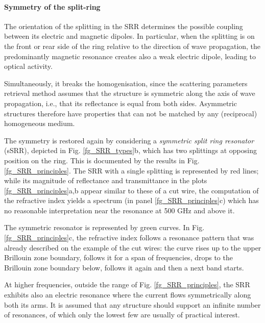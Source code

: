 \paragraph{Symmetry of the split-ring}%
The orientation of the splitting in the SRR determines the possible coupling between its electric and magnetic dipoles. In particular, when the splitting is on the front or rear side of the ring relative to the  direction of wave propagation, the predominantly magnetic resonance creates also a weak electric dipole, leading to optical activity. %

Simultaneously, it breaks the homogenisation, since the scattering parameters retrieval method assumes that the structure is symmetric along the axis of wave propagation, i.e., that its reflectance is equal from both sides. Asymmetric structures therefore have properties that can not be matched by any (reciprocal) homogeneous medium. 

The symmetry is restored again by considering a \textit{symmetric split ring resonator} (sSRR), depicted in Fig. \ref{fg_SRR_types}b, which has two splittings at opposing position on the ring. 
This is documented by the results in Fig. \ref{fg_SRR_principles}. The SRR with a single splitting is represented by red lines; while its magnitude of reflectance and transmittance in the plots \ref{fg_SRR_principles}a,b appear similar to these of a cut wire, the computation of the refractive index yields a spectrum (in panel \ref{fg_SRR_principles}c) which has no reasonable interpretation near the resonance at 500 GHz and above it. 

The symmetric resonator is represented by green curves. In Fig. \ref{fg_SRR_principles}c, the refractive index follows a resonance pattern that was already described on the example of the cut wires: the curve rises up to the upper Brillouin zone boundary, follows it for a span of frequencies, drops to the Brillouin zone boundary below, follows it again and then a next band starts. 

At higher frequencies, outside the range of Fig. \ref{fg_SRR_principles}, the SRR exhibits also an electric resonance where the current flows symmetrically along both its arms. It is assumed that any structure should support an infinite number of resonances, of which only the lowest few are usually of practical interest.
